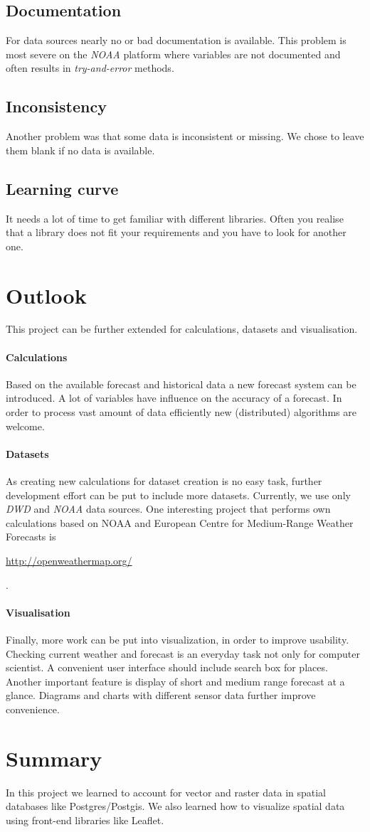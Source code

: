 \documentclass{scrartcl}
\begin{document}
\subsection{Documentation}
For data sources nearly no or bad documentation is available. This problem
is most severe on the \textit{NOAA} platform where variables are not
documented and often results in \textit{try-and-error} methods.

\subsection{Inconsistency}
Another problem was that some data is inconsistent or missing. We chose to leave
them blank if no data is available.

\subsection{Learning curve}
It needs a lot of time to get familiar with different libraries. Often you
realise that a library does not fit your requirements and you have to look for
another one.


\section{Outlook}
This project can be further extended for calculations, datasets and
visualisation.
\paragraph{Calculations}
Based on the available forecast and historical data a new forecast system can be
introduced. A lot of variables have influence on the accuracy of a forecast. In order to process vast amount of data efficiently new (distributed) algorithms are welcome.
\paragraph{Datasets} As creating new calculations for dataset creation is no easy task, further development effort can be put to include more datasets. Currently, we use only \textit{DWD} and \textit{NOAA} data sources. One interesting project that performs own calculations based on NOAA and European Centre for Medium-Range Weather Forecasts is 
\begin{center}
	\url{http://openweathermap.org/}
\end{center}.

\paragraph{Visualisation} Finally, more work can be put into visualization, in
order to improve usability. Checking current weather and forecast is an everyday task not only for computer scientist. A convenient user interface should include search box for places. Another important feature is display of short and medium range forecast at a glance. Diagrams and charts with different sensor data further improve convenience.

\section{Summary}
In this project we learned to account for vector and raster data in spatial
databases like Postgres/Postgis. We also learned how to visualize spatial data
using front-end libraries like Leaflet.
\end{document}
